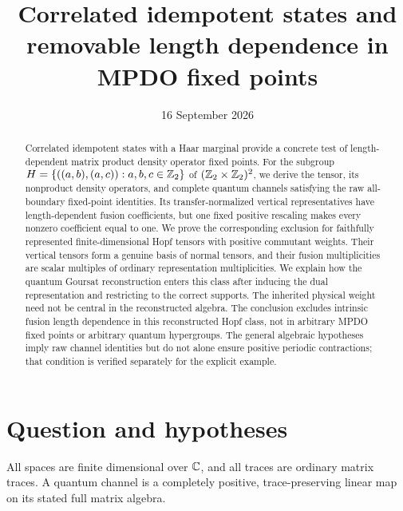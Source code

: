 \documentclass[aps,pra,reprint,nofootinbib,onecolumn]{revtex4-2}
\begin{document}
\title{Correlated idempotent states and removable length dependence in MPDO fixed points}
\date{16 September 2026}
\begin{abstract}
	Correlated idempotent states with a Haar marginal provide a concrete test of length-dependent matrix product density operator fixed points. For the subgroup
	$H=\{((a,b),(a,c)):a,b,c\in\mathbb{Z}_2\}$ of
	$(\mathbb{Z}_2\times\mathbb{Z}_2)^2$, we derive the tensor, its nonproduct density operators, and complete quantum channels satisfying the raw all-boundary fixed-point identities. Its transfer-normalized vertical representatives have length-dependent fusion coefficients, but one fixed positive rescaling makes every nonzero coefficient equal to one. We prove the corresponding exclusion for faithfully represented finite-dimensional Hopf tensors with positive commutant weights. Their vertical tensors form a genuine basis of normal tensors, and their fusion multiplicities are scalar multiples of ordinary representation multiplicities. We explain how the quantum Goursat reconstruction enters this class after inducing the dual representation and restricting to the correct supports. The inherited physical weight need not be central in the reconstructed algebra. The conclusion excludes intrinsic fusion length dependence in this reconstructed Hopf class, not in arbitrary MPDO fixed points or arbitrary quantum hypergroups. The general algebraic hypotheses imply raw channel identities but do not alone ensure positive periodic contractions; that condition is verified separately for the explicit example.
\end{abstract}
\maketitle

\section{Question and hypotheses}

All spaces are finite dimensional over $\mathbb{C}$, and all traces are ordinary matrix traces. A quantum channel is a completely positive, trace-preserving linear map on its stated full matrix algebra.
\end{document}
